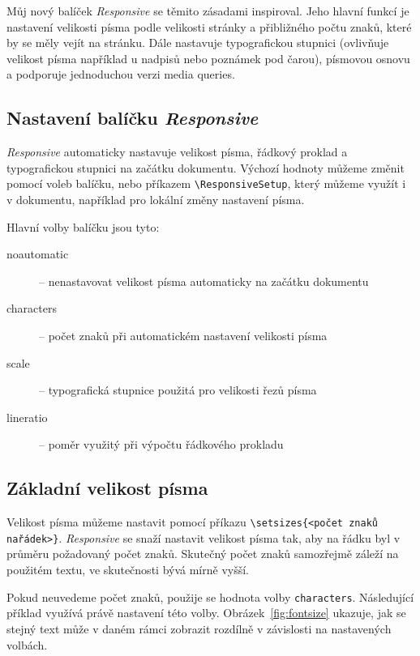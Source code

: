 \documentclass{csbulletin}
\newcommand\balicek[1]{\textit{#1}}
\begin{document}
Můj nový balíček \balicek{Responsive} \cite{responsive} se těmito zásadami inspiroval. 
Jeho hlavní funkcí je nastavení velikosti písma podle velikosti stránky
a přibližného počtu znaků, které by se měly vejít na stránku. 
Dále nastavuje typografickou stupnici (ovlivňuje velikost písma například 
u nadpisů nebo poznámek pod čarou), písmovou osnovu a podporuje
jednoduchou verzi media queries.

\subsection{Nastavení balíčku \balicek{Responsive}}

\balicek{Responsive} automaticky nastavuje velikost písma, řádkový proklad
a typografickou stupnici na začátku dokumentu. Výchozí hodnoty můžeme změnit
pomocí voleb balíčku, nebo příkazem \verb|\ResponsiveSetup|, který můžeme 
využít i v dokumentu, například pro lokální změny nastavení písma. 

Hlavní volby balíčku jsou tyto:

\begin{description}
  \item[noautomatic] – nenastavovat velikost písma automaticky na začátku dokumentu
  \item[characters] – počet znaků při automatickém nastavení velikosti písma
  \item[scale] –  typografická stupnice použitá pro velikosti řezů písma
  \item[lineratio] – poměr využitý při výpočtu řádkového prokladu
\end{description}

\subsection{Základní velikost písma}

Velikost písma můžeme nastavit pomocí příkazu \verb|\setsizes{<počet znaků na|\allowbreak\verb|řádek>}|. 
\balicek{Responsive} se snaží nastavit velikost písma tak, aby na řádku byl v průměru
požadovaný počet znaků. Skutečný počet znaků samozřejmě záleží na použitém textu, ve 
skutečnosti bývá mírně vyšší.

Pokud neuvedeme počet znaků, použije se hodnota volby \texttt{characters}.
Následující příklad využívá právě nastavení této volby. Obrázek~\ref{fig:fontsize} 
ukazuje, jak se stejný text může v daném rámci zobrazit rozdílně v závislosti na
nastavených volbách.
\end{document}
